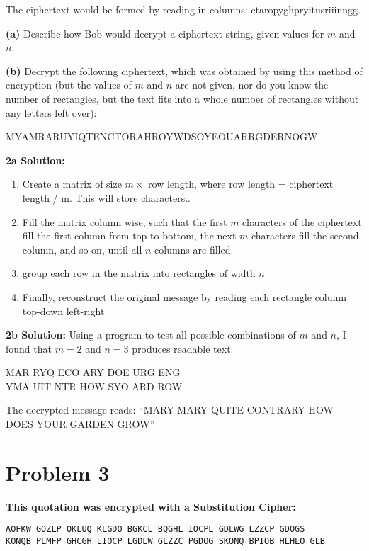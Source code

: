 \documentclass[12pt]{article}
\begin{document}
The ciphertext would be formed by reading in columns: ctaropyghpryitusriiinngg.

\textbf{(a)} Describe how Bob would decrypt a ciphertext string, given values for $m$ and $n$.

\textbf{(b)} Decrypt the following ciphertext, which was obtained by using this method of encryption (but the values of $m$ and $n$ are not given, nor do you know the number of rectangles, but the text fits into a whole number of rectangles without any letters left over):

MYAMRARUYIQTENCTORAHROYWDSOYEOUARRGDERNOGW

\vspace{1em}
\textbf{2a Solution:}

\begin{enumerate}
    \item Create a matrix of size $m \times$ row length, where row length = ciphertext length / m. This will store characters..
    \item Fill the matrix column wise, such that the first $m$ characters of the ciphertext fill the first column from top to bottom, the next $m$ characters fill the second column, and so on, until all $n$ columns are filled.
    \item group each row in the matrix into rectangles of width $n$
    \item Finally, reconstruct the original message by reading each rectangle column top-down left-right
\end{enumerate}

\vspace{1em}
\textbf{2b Solution:}
Using a program to test all possible combinations of $m$ and $n$, I found that $m=2$ and $n=3$ produces readable text:

\begin{center}
MAR RYQ ECO ARY DOE URG ENG\\
YMA UIT NTR HOW SYO ARD ROW
\end{center}

The decrypted message reads: ``MARY MARY QUITE CONTRARY HOW DOES YOUR GARDEN GROW''

\newpage
\section*{Problem 3}
\textbf{This quotation was encrypted with a Substitution Cipher:}

\begin{verbatim}
AOFKW GOZLP OKLUQ KLGDO BGKCL BQGHL IOCPL GDLWG LZZCP GDOGS
KONQB PLMFP GHCGH LIOCP LGDLW GLZZC PGDOG SKONQ BPIOB HLHLO GLB
\end{verbatim}
\end{document}
